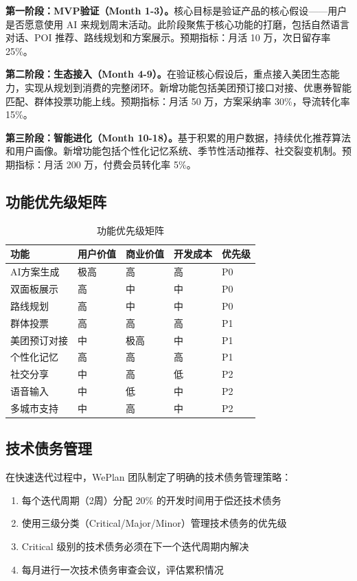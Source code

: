\documentclass[12pt,a4paper]{ctexart}
\begin{document}
\textbf{第一阶段：MVP验证（Month 1-3）。}核心目标是验证产品的核心假设——用户是否愿意使用 AI 来规划周末活动。此阶段聚焦于核心功能的打磨，包括自然语言对话、POI 推荐、路线规划和方案展示。预期指标：月活 10 万，次日留存率 25\%。

\textbf{第二阶段：生态接入（Month 4-9）。}在验证核心假设后，重点接入美团生态能力，实现从规划到消费的完整闭环。新增功能包括美团预订接口对接、优惠券智能匹配、群体投票功能上线。预期指标：月活 50 万，方案采纳率 30\%，导流转化率 15\%。

\textbf{第三阶段：智能进化（Month 10-18）。}基于积累的用户数据，持续优化推荐算法和用户画像。新增功能包括个性化记忆系统、季节性活动推荐、社交裂变机制。预期指标：月活 200 万，付费会员转化率 5\%。

\subsection{功能优先级矩阵}

\begin{table}[H]
\centering
\caption{功能优先级矩阵}
\label{tab:feature-priority}
\renewcommand{\arraystretch}{1.3}
{\small
\begin{tabular}{p{3.5cm} p{2cm} p{2cm} p{2cm} p{2cm}}
\toprule
\textbf{功能} & \textbf{用户价值} & \textbf{商业价值} & \textbf{开发成本} & \textbf{优先级} \\
\midrule
AI方案生成 & 极高 & 高 & 高 & P0 \\
双面板展示 & 高 & 中 & 中 & P0 \\
路线规划 & 高 & 中 & 中 & P0 \\
群体投票 & 高 & 高 & 高 & P1 \\
美团预订对接 & 中 & 极高 & 中 & P1 \\
个性化记忆 & 高 & 高 & 高 & P1 \\
社交分享 & 中 & 高 & 低 & P2 \\
语音输入 & 中 & 低 & 中 & P2 \\
多城市支持 & 中 & 高 & 中 & P2 \\
\bottomrule
\end{tabular}
}
\end{table}

\subsection{技术债务管理}

在快速迭代过程中，WePlan 团队制定了明确的技术债务管理策略：

\begin{enumerate}[leftmargin=2em]
  \item 每个迭代周期（2周）分配 20\% 的开发时间用于偿还技术债务
  \item 使用三级分类（Critical/Major/Minor）管理技术债务的优先级
  \item Critical 级别的技术债务必须在下一个迭代周期内解决
  \item 每月进行一次技术债务审查会议，评估累积情况
\end{enumerate}
\end{document}
